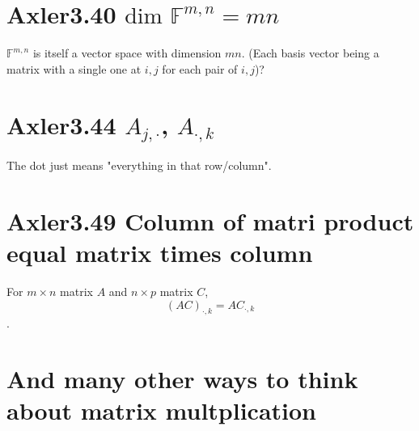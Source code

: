\documentclass[letterpaper]{article}
\begin{document}
\section{Axler3.40 \(\text{dim }\mathbb F^{m,n} = mn\)}
\label{sec:org4e69922}
\(\mathbb F^{m,n}\) is itself a vector space with dimension \(mn\). (Each basis vector being a matrix with a single one at \(i, j\) for each pair of \(i, j\))?
\section{Axler3.44 \(A_{j,\cdot}\), \(A_{\cdot, k}\)}
\label{sec:org6099981}
The dot just means "everything in that row/column".
\section{Axler3.49 Column of matri product equal matrix times column}
\label{sec:org0b1ba33}
For \(m\times n\) matrix \(A\) and \(n\times p\) matrix \(C\), $$(AC)_{\cdot, k} = AC_{\cdot, k}$$.
\section{And many other ways to think about matrix multplication}
\label{sec:org007efb1}
\end{document}
